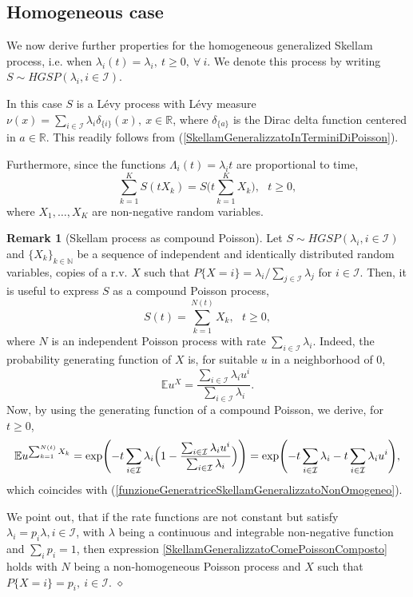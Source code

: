 \documentclass[12pt, twoside, english, headsepline]{article}
\theoremstyle{definition} %
\newtheorem{remark}{Remark}[section] %
\numberwithin{equation}{section} %
\begin{document}
\subsection{Homogeneous case}\label{sottosezioneCasoOmogeneo}

We now derive further properties for the homogeneous generalized Skellam process, i.e. when $\lambda_i(t) = \lambda_i,\ t\ge0,\ \forall \ i$. We denote this process by writing $S\sim HGSP (\lambda_i, i\in \mathcal{I} )$.

In this case $S$ is a L\'{e}vy process with L\'{e}vy measure $\nu(x) = \sum_{i\in\mathcal{I}} \lambda_i\delta_{\{i\}}(x),\ x\in\mathbb{R}$, where $\delta_{\{a\}} $ is the Dirac delta function centered in $a\in\mathbb{R}$. This readily follows from (\ref{SkellamGeneralizzatoInTerminiDiPoisson}).

Furthermore, since the functions $\Lambda_i(t) = \lambda_i t$ are proportional to time, 
\begin{equation}\label{sommaSkellamOmogeneoConTempoModificato}
\sum_{k=1}^K S(t X_k ) = S\Bigg(t\sum_{k=1}^K X_k\Bigg), \ \ \ t\ge0,
\end{equation}
 where $X_1,\dots, X_K$ are non-negative random variables.

\begin{remark}[Skellam process as compound Poisson]\label{proposizioneSkellamGeneralizzatoPoissonComposto}
Let $S\sim HGSP (\lambda_i, i\in \mathcal{I} )$ and $\{X_k\}_{k\in\mathbb{N}}$ be a sequence of independent and identically distributed random variables, copies of a r.v. $X$ such that $P\{X = i\} = \lambda_i / \sum_{j\in\mathcal{I}} \lambda_j$ for $i\in\mathcal{I}$. Then, it is useful to express $S$ as a compound Poisson process,
\begin{equation}\label{SkellamGeneralizzatoComePoissonComposto}
S(t) = \sum_{k = 1}^{N(t)} X_k,\ \ \ t\ge0,
\end{equation}
where $N$ is an independent Poisson process with rate $\sum_{i\in\mathcal{I}} \lambda_i$.  Indeed, the probability generating function of $X$ is, for suitable $u$ in a neighborhood of $0$,
$$\mathbb{E} u^X = \frac{\sum_{i\in\mathcal{I}} \lambda_i u^i}{ \sum_{i\in\mathcal{I}} \lambda_i}. $$
Now, by using the generating function of a compound Poisson, we derive, for $t\ge0$,
\begin{equation*}
\mathbb{E} u^{\sum_{k=1}^{N(t)} X_k} = \text{exp}\Biggl(-t \sum_{i\in\mathcal{I}}  \lambda_i \Bigl(1-\frac{\sum_{i\in\mathcal{I}} \lambda_i u^i}{ \sum_{i\in\mathcal{I}} \lambda_i}\Bigr) \Biggr) = \text{exp}\Biggl(-t \sum_{i\in\mathcal{I}}  \lambda_i -t\sum_{i\in\mathcal{I}} \lambda_iu^i  \Biggr),
\end{equation*}
which coincides with (\ref{funzioneGeneratriceSkellamGeneralizzatoNonOmogeneo}). 

We point out, that if the rate functions are not constant but satisfy $\lambda_i =p_i\lambda, i\in\mathcal{I}$, with $\lambda$ being a continuous and integrable non-negative function and $\sum_{i}p_i = 1$, then expression \eqref{SkellamGeneralizzatoComePoissonComposto} holds with $N$ being a non-homogeneous Poisson process and $X$ such that $P\{X=i\} = p_i,\ i\in\mathcal{I}$. \hfill $\diamond$
\end{remark}
\end{document}
